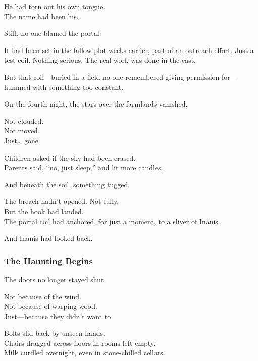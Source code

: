 \documentclass[12pt]{article}
\begin{document}
\vspace{0.5em}
He had torn out his own tongue.\\
The name had been his.

\vspace{0.5em}
Still, no one blamed the portal.

\vspace{0.5em}
It had been set in the fallow plot weeks earlier, part of an outreach effort. Just a test coil. Nothing serious. The real work was done in the east.

\vspace{0.5em}
But that coil---buried in a field no one remembered giving permission for---hummed with something too constant.

\vspace{0.5em}
On the fourth night, the stars over the farmlands vanished.

\vspace{0.5em}
Not clouded.\\
Not moved.\\
Just\ldots{} gone.

\vspace{0.5em}
Children asked if the sky had been erased.\\
Parents said, ``no, just sleep,'' and lit more candles.

\vspace{0.5em}
And beneath the soil, something tugged.

\vspace{0.5em}
The breach hadn’t opened. Not fully.\\
But the hook had landed.\\
The portal coil had anchored, for just a moment, to a sliver of Inanis.

\vspace{0.5em}
And Inanis had looked back.

\dotfill

\subsubsection{The Haunting Begins}

The doors no longer stayed shut.

\vspace{0.5em}
Not because of the wind.\\
Not because of warping wood.\\
Just---because they didn’t want to.

\vspace{0.5em}
Bolts slid back by unseen hands.\\
Chairs dragged across floors in rooms left empty.\\
Milk curdled overnight, even in stone-chilled cellars.
\end{document}
